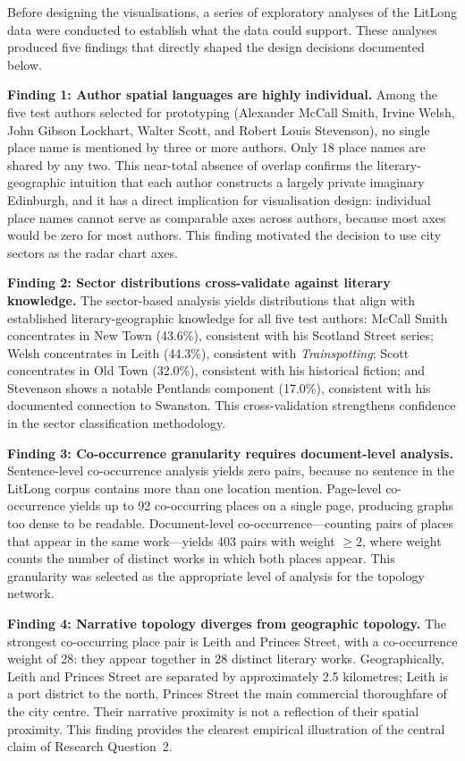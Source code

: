 \documentclass[logo,msc]{infthesis}
\begin{document}
Before designing the visualisations, a series of exploratory analyses of the LitLong data were conducted to establish what the data could support. These analyses produced five findings that directly shaped the design decisions documented below.
 
\textbf{Finding 1: Author spatial languages are highly individual.} Among the five test authors selected for prototyping (Alexander McCall Smith, Irvine Welsh, John Gibson Lockhart, Walter Scott, and Robert Louis Stevenson), no single place name is mentioned by three or more authors. Only 18 place names are shared by any two. This near-total absence of overlap confirms the literary-geographic intuition that each author constructs a largely private imaginary Edinburgh, and it has a direct implication for visualisation design: individual place names cannot serve as comparable axes across authors, because most axes would be zero for most authors. This finding motivated the decision to use city sectors as the radar chart axes.
 
\textbf{Finding 2: Sector distributions cross-validate against literary knowledge.} The sector-based analysis yields distributions that align with established literary-geographic knowledge for all five test authors: McCall Smith concentrates in New Town (43.6\%), consistent with his Scotland Street series; Welsh concentrates in Leith (44.3\%), consistent with \textit{Trainspotting}; Scott concentrates in Old Town (32.0\%), consistent with his historical fiction; and Stevenson shows a notable Pentlands component (17.0\%), consistent with his documented connection to Swanston. This cross-validation strengthens confidence in the sector classification methodology.
 
\textbf{Finding 3: Co-occurrence granularity requires document-level analysis.} Sentence-level co-occurrence analysis yields zero pairs, because no sentence in the LitLong corpus contains more than one location mention. Page-level co-occurrence yields up to 92 co-occurring places on a single page, producing graphs too dense to be readable. Document-level co-occurrence---counting pairs of places that appear in the same work---yields 403 pairs with weight $\geq 2$, where weight counts the number of distinct works in which both places appear. This granularity was selected as the appropriate level of analysis for the topology network.
 
\textbf{Finding 4: Narrative topology diverges from geographic topology.} The strongest co-occurring place pair is Leith and Princes Street, with a co-occurrence weight of 28: they appear together in 28 distinct literary works. Geographically, Leith and Princes Street are separated by approximately 2.5 kilometres; Leith is a port district to the north, Princes Street the main commercial thoroughfare of the city centre. Their narrative proximity is not a reflection of their spatial proximity. This finding provides the clearest empirical illustration of the central claim of Research Question~2.
 
\end{document}
